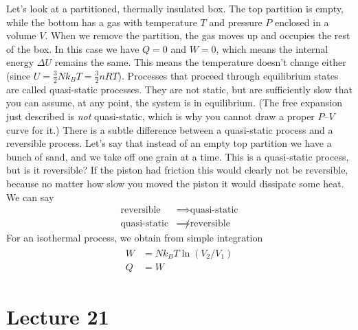 \documentclass{report}
\numberwithin{equation}{section}
\begin{document}
Let's look at a partitioned, thermally insulated box. The top partition is empty, while the bottom has a gas with temperature $T$ and pressure $P$ enclosed in a volume $V$. When we remove the partition, the gas moves up and occupies the rest of the box. In this case we have $Q=0$ and $W=0$, which means the internal energy $\Delta U$ remains the same. This means the temperature doesn't change either (since $U = \frac{3}{2}Nk_BT = \frac{3}{2}nRT$). Processes that proceed through equilibrium states are called quasi-static processes. They are not static, but are sufficiently slow that you can assume, at any point, the system is in equilibrium. (The free expansion just described is \emph{not} quasi-static, which is why you cannot draw a proper $P$--$V$ curve for it.) There is a subtle difference between a quasi-static process and a reversible process. Let's say that instead of an empty top partition we have a bunch of sand, and we take off one grain at a time. This is a quasi-static process, but is it reversible? If the piston had friction this would clearly not be reversible, because no matter how slow you moved the piston it would dissipate some heat. We can say
\begin{align*}
    \text{reversible} &\implies \text{quasi-static}\\
    \text{quasi-static} &\not\implies \text{reversible}
\end{align*}
For an isothermal process, we obtain from simple integration
\begin{align}
\begin{split}
    W &= Nk_BT\ln(V_2/V_1)\\
    Q &= W
\end{split}
\end{align}
\section{Lecture 21}
\end{document}
